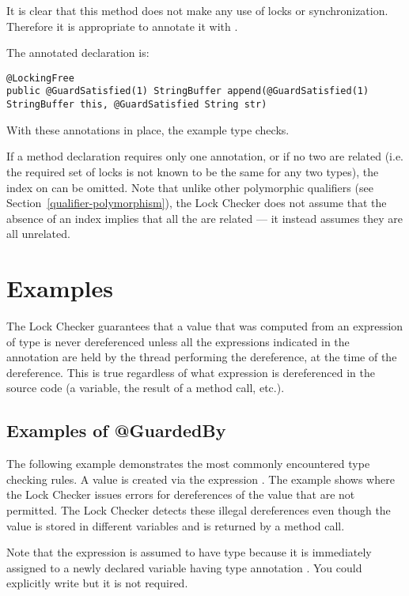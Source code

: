 It is clear that this method does not make any use of
locks or synchronization.  Therefore it is appropriate to annotate it
with .

The annotated declaration is:

\begin{verbatim}
@LockingFree
public @GuardSatisfied(1) StringBuffer append(@GuardSatisfied(1) StringBuffer this, @GuardSatisfied String str)
\end{verbatim}

With these annotations in place, the example type checks.

If a method declaration requires only one  annotation, or if
no two  are related (i.e. the required set of locks is not known
to be the same for any two types), the index on  can be omitted.
Note that unlike other polymorphic qualifiers (see Section~\ref{qualifier-polymorphism}), the Lock Checker does not assume
that the absence of an index implies that all the  are related
--- it instead assumes they are all unrelated.

\section{Examples\label{lock-examples}}

The Lock Checker guarantees that a value that was computed from an expression of  type is
never dereferenced unless all the expressions indicated in the
 annotation are held by the thread performing the
dereference, at the time of the dereference.  This is true regardless of what
expression is dereferenced in the source code (a variable, the result of a method call, etc.).

\subsection{Examples of @GuardedBy\label{lock-examples-guardedby}}

The following example demonstrates the most commonly encountered
type checking rules.  A value is created via the expression
.  The example shows where the Lock Checker issues errors
for dereferences of the value that are not permitted.  The Lock Checker
detects these illegal dereferences even though the value is stored in
different variables and is returned by a method call.

Note that the expression  is assumed to have type 
because it is immediately assigned to a newly declared
variable having type annotation .  You could
explicitly write  but it is not
required.

